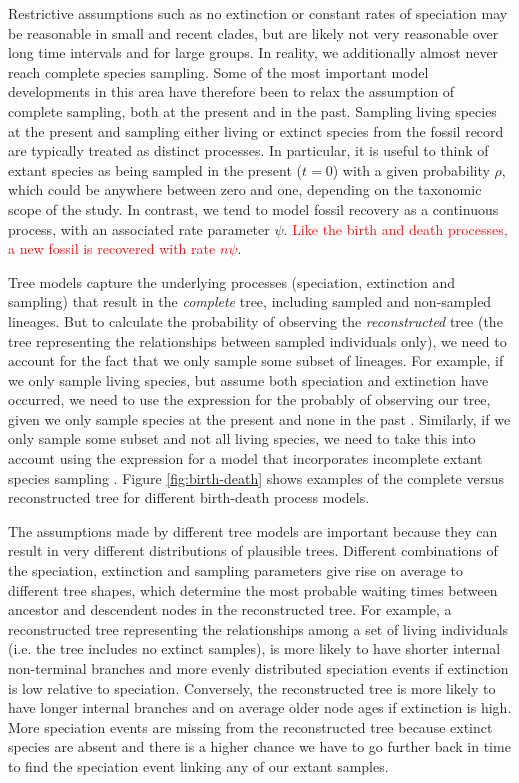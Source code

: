 \documentclass[11pt]{article}
\newcommand{\edit}[1]{{\textcolor{red}{#1}}} %
\begin{document}
Restrictive assumptions such as no extinction or constant rates of speciation may be reasonable in small and recent clades, but are likely not very reasonable over long time intervals and for large groups.
In reality, we additionally almost never reach complete species sampling.
Some of the most important model developments in this area have therefore been to relax the assumption of complete sampling, both at the present and in the past.
Sampling living species at the present and sampling either living or extinct species from the fossil record are typically treated as distinct processes.
In particular, it is useful to think of extant species as being sampled in the present ($t=0$) with a given probability $\rho$, which could be anywhere between zero and one, depending on the taxonomic scope of the study.
In contrast, we tend to model fossil recovery as a continuous process, with an associated rate parameter $\psi$. \edit{Like the birth and death processes, a new fossil is recovered with rate $n\psi$}.

Tree models capture the underlying processes (speciation, extinction and sampling) that result in the \textit{complete} tree, including sampled and non-sampled lineages. But to calculate the probability of observing the  \textit{reconstructed} tree (the tree representing the relationships between sampled individuals only), we need to account for the fact that we only sample some subset of lineages.
For example, if we only sample living species, but assume both speciation and extinction have occurred, we need to use the expression for the probably of observing our tree, given we only sample species at the present and none in the past \cite{Thompson1975,Gernhard2008, Stadler2009}.  Similarly, if we only sample some subset and not all living species, we need to take this into account using the expression for a model that incorporates incomplete extant species sampling \cite{Yang1997,Stadler2009}.
Figure \ref{fig:birth-death} shows examples of the complete versus reconstructed tree for different birth-death process models.


The assumptions made by different tree models are important because they can result in very different distributions of plausible trees.
Different combinations of the speciation, extinction and sampling parameters give rise on average to different tree shapes, which determine the most probable waiting times between ancestor and descendent nodes 
in the reconstructed tree.
For example, a reconstructed tree representing the relationships among a set of living individuals (i.e. the tree includes no extinct samples),  
 is more likely to have shorter internal non-terminal branches and more evenly distributed speciation events if extinction is low relative to speciation.
Conversely, the reconstructed tree is more likely to have longer internal branches and on average older node ages if extinction is high.
More speciation events are missing from the reconstructed tree because extinct species are absent and there is a higher chance we have to go further back in time to find the speciation event linking any of our extant samples.
\end{document}
